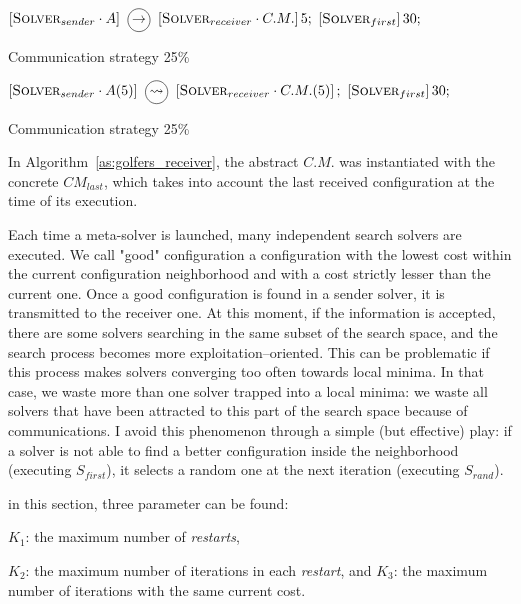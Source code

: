 \begin{algorithm}
\dontprintsemicolon
\SetNoline
$\left[\eqsolverposl{sender}\cdot A\right] \onetoone \left[\eqsolverposl{receiver}\cdot C.M.\right]5;$\;
$\left[\textbf{{\sc Solver}}_{first}\right]30;$
\caption{Communication strategy \oneTone{} 25\%}\label{comm:golfers_1_1-1_25}
\end{algorithm}

\begin{algorithm}
\dontprintsemicolon
\SetNoline
$\left[\eqsolverposl{sender}\cdot A(5)\right] \oneton \left[\eqsolverposl{receiver}\cdot C.M.(5)\right];$\;
$\left[\textbf{{\sc Solver}}_{first}\right]30;$
\caption{Communication strategy \oneTn{} 25\%}\label{comm:golfers_1_1-n_25}
\end{algorithm}

In Algorithm~\ref{as:golfers_receiver}, the abstract \opch{} $C.M.$ was instantiated with the concrete \opch{} $CM_{last}$, which takes into account the last received configuration at the time of its execution.

Each time a \posl{} meta-solver is launched, many independent search solvers are executed. We call "good" configuration a configuration with the lowest cost within the current configuration neighborhood and with a cost strictly lesser than the current one. Once a good configuration is found in a sender solver, it is transmitted to the receiver one. At this moment, if the information is accepted, there are some solvers searching in the same subset of the search space, and the search process becomes more exploitation--oriented. This can be problematic if this process makes solvers converging too often towards local minima. In that case, we waste more than one solver trapped into a local minima: we waste all solvers that have been attracted to this part of the search space because of communications. I avoid this phenomenon through a simple (but effective) play: if a solver is not able to find a better configuration inside the neighborhood (executing $S_{first}$), it selects a random one at the next iteration (executing $S_{rand}$).

 in this section, three parameter can be found:\begin{inparaenum}[1.] \item $K_1$: the maximum number of {\it restarts}, \item $K_2$: the maximum number of iterations in each \textit{restart}, and $K_3$: the maximum number of iterations with the same current cost. \item \end{inparaenum}

